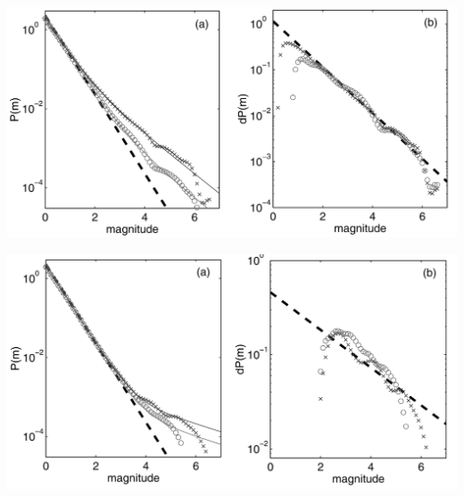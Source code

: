 \documentclass[aspectratio=43,9pt]{beamer}
\begin{document}
\begin{frame}
 {}
 
 \begin{minipage}{0.48\linewidth}
   \includegraphics[width=1\linewidth]{Figs/fig7}
 \end{minipage}
 \begin{minipage}{0.48\linewidth}

 \end{minipage}

 
\end{frame}



\begin{frame}
 {}
 
 \begin{minipage}{0.48\linewidth}
   \includegraphics[width=1\linewidth]{Figs/fig8}
 \end{minipage}
 \begin{minipage}{0.48\linewidth}

 \end{minipage}

 
\end{frame}
\end{document}
